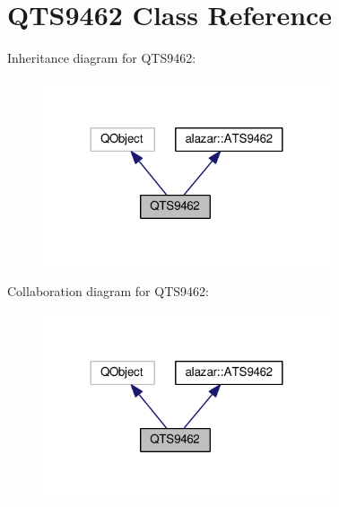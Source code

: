 \hypertarget{class_q_t_s9462}{}\section{Q\+T\+S9462 Class Reference}
\label{class_q_t_s9462}


Inheritance diagram for Q\+T\+S9462\+:
\nopagebreak
\begin{figure}[H]
\begin{center}
\leavevmode
\includegraphics[width=240pt]{class_q_t_s9462__inherit__graph}
\end{center}
\end{figure}


Collaboration diagram for Q\+T\+S9462\+:
\nopagebreak
\begin{figure}[H]
\begin{center}
\leavevmode
\includegraphics[width=240pt]{class_q_t_s9462__coll__graph}
\end{center}
\end{figure}
